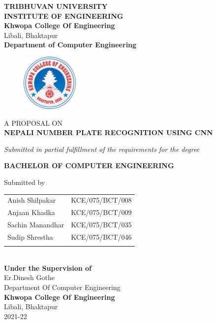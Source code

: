 \begin{center}
	\thispagestyle{empty}
	\Large\textbf{TRIBHUVAN UNIVERSITY}\\
	\Large\textbf{INSTITUTE OF ENGINEERING }\\
	\vspace{0.2in}
	\large{\textbf{Khwopa College Of Engineering}\\}
	\normalsize{Libali, Bhaktapur\\}
	\large\textbf{Department of Computer Engineering}
	\vspace{0.2in}
	\begin{figure}[h]
	    \centering
		    \includegraphics[width=0.25\textwidth]{img/Khwopa_logo.jpg}
	\end{figure}
	
	\vspace{0.2in}
	\large{A PROPOSAL ON\\\textbf{NEPALI NUMBER PLATE RECOGNITION USING CNN}\\}
	
	\vspace{0.2in}
	\large{\textit{Submitted in partial fulfillment of the requirements for the degree\\}}
	
	\vspace{0.2in}
	\large{\textbf{BACHELOR OF COMPUTER ENGINEERING}\\}
	
	\vspace{0.2in}
	\large{Submitted by}\\
	\begin{tabular}{p{3.5in}p{3in}}
		\hspace{0.3cm}Anish Shilpakar & KCE/075/BCT/008\\
		\hspace{0.3cm}Anjaan Khadka & KCE/075/BCT/009\\
		\hspace{0.3cm}Sachin Manandhar & KCE/075/BCT/035\\
		\hspace{0.3cm}Sudip Shrestha & KCE/075/BCT/046\\
	 \vspace{0.2in}
	\end{tabular}
	\\
	\vspace{1cm}
	\large{\textbf{Under the Supervision of}\\}
		\normalsize{Er.Dinesh Gothe\\
			Department Of Computer Engineering\\
		}
		\vspace{2cm}
	\large{\textbf{Khwopa College Of Engineering}\\}
		\normalsize{Libali, Bhaktapur\\
		2021-22
	}
\end{center}